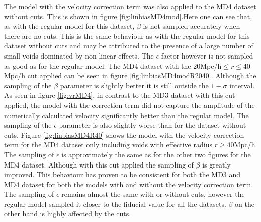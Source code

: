The model with the velocity correction term was also applied to the MD4 dataset without cuts. This is shown in figure \ref{fig:linbiasMD4mod}.Here one can see that, as with the regular model for this dataset, $\beta$ is not sampled accurately when there are no cuts. 
This is the same behaviour as with the regular model for this dataset without cuts and may be attributed to the presence of a large number of small voids dominated by non-linear effects. The $\epsilon$ factor however is not sampled as good as for the regular model. The MD4 dataset with the $20$Mpc/h$\leq r\leq 40$Mpc/h cut applied can be seen in figure \ref{fig:linbiasMD4modR2040}. Although the sampling of the $\beta$ parameter is slightly better it is still outside the $1-\sigma$ interval. As seen in figure \ref{fig:vrMD4}, in contrast to the MD3 dataset with this cut applied, the model with the correction term did not capture the amplitude of the numerically calculated velocity significantly better than the regular model. The sampling of the $\epsilon$ parameter is also slightly worse than for the dataset without cuts. Figure \ref{fig:linbiasMD4R40} shows the model with the velocity correction term for the MD4 dataset only including voids with effective radius $r\geq 40$Mpc/h. The sampling of $\epsilon$ is approximately the same as for the other two figures for the MD4 dataset. Although with this cut applied the sampling of $\beta$ is greatly improved. This behaviour has proven to be consistent for both the MD3 and MD4 dataset for both the models with and without the velocity correction term. The sampling of $\epsilon$ remains almost the same with or without cuts, however the regular model sampled it closer to the fiducial value for all the datasets. $\beta$ on the other hand is highly affected by the cuts.

